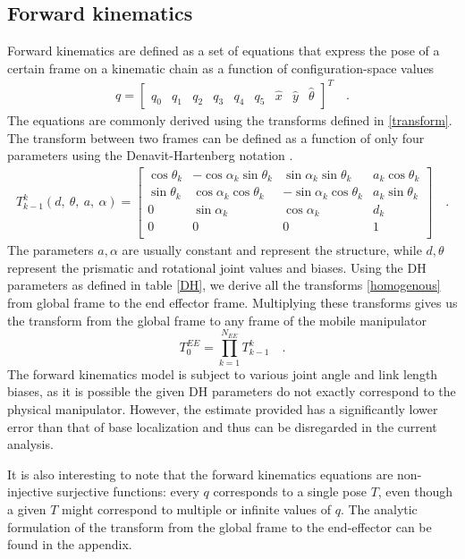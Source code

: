 \documentclass[times, utf8, diplomski, english]{fer}
\begin{document}
\subsection{Forward kinematics}\label{subsection:FK}
Forward kinematics are defined as a set of equations that express the pose of a certain frame on a kinematic chain as a function of configuration-space values
\begin{align}\label{eq:config_matrix}
q = 
\begin{bmatrix}
q_0& q_1& q_2& q_3& q_4& q_5& \hat{x}& \hat{y}& \hat{\theta}
\end{bmatrix}^T \quad .
\end{align}
The equations are commonly derived using the transforms defined in \eqref{transform}.
The transform between two frames can be defined as a function of only four parameters using the Denavit-Hartenberg notation \citep{uicker1964iterative}.
\begin{align}
T_{k-1}^k(d, \ \theta, \ a, \ \alpha)
=
\begin{bmatrix}
\cos\theta_{k}& -\cos\alpha_{k}\sin\theta_{k} & \sin\alpha_{k}\sin\theta_{k} & a_k\cos\theta_{k}\\
\sin\theta_{k}& \cos\alpha_{k}\cos\theta_{k} & -\sin\alpha_{k}\cos\theta_{k} & a_k\sin\theta_{k}\\
0 & \sin\alpha_{k} & \cos\alpha_{k} & d_{k}\\
0 & 0 & 0 & 1\\
\end{bmatrix} \quad .
\label{homogenous}
\end{align}
The parameters $a, \alpha$ are usually constant and represent the structure, while $d, \theta$ represent the prismatic and rotational joint values and biases.
Using the DH parameters as defined in table \ref{DH}, we derive all the transforms \eqref{homogenous} from global frame to the end effector frame.
Multiplying these transforms gives us the transform from the global frame to any frame of the mobile manipulator
\begin{equation}
T_{0}^{EE} = \prod_{k=1}^{N_{EE}} T_{k-1}^{k} \quad .
\label{FK}
\end{equation}
The forward kinematics model is subject to various joint angle and link length biases, as it is possible the given DH parameters do not exactly correspond to the physical manipulator.
However, the estimate provided has a significantly lower error than that of base localization and thus can be disregarded in the current analysis.

It is also interesting to note that the forward kinematics equations are non-injective surjective functions: 
every $q$ corresponds to a single pose $T$, even though a given $T$ might correspond to multiple or infinite values of $q$.
The analytic formulation of the transform from the global frame to the end-effector can be found in the appendix.
\end{document}
